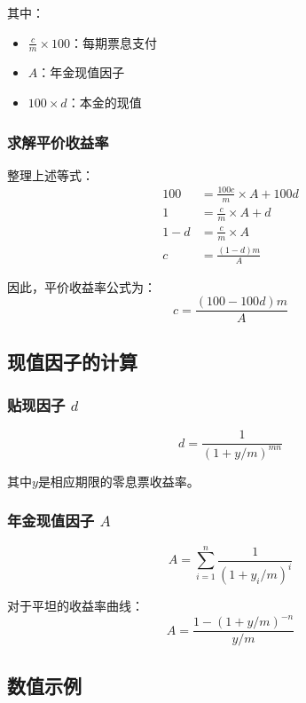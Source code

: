 其中：
\begin{itemize}
    \item $\frac{c}{m} \times 100$：每期票息支付
    \item $A$：年金现值因子
    \item $100 \times d$：本金的现值
\end{itemize}

\subsubsection{求解平价收益率}

整理上述等式：
\begin{align}
100 &= \frac{100c}{m} \times A + 100d \\
1 &= \frac{c}{m} \times A + d \\
1 - d &= \frac{c}{m} \times A \\
c &= \frac{(1-d)m}{A}
\end{align}

因此，平价收益率公式为：
\begin{equation}
\boxed{c = \frac{(100-100d)m}{A}}
\end{equation}

\subsection{现值因子的计算}

\subsubsection{贴现因子 $d$}

\begin{equation}
d = \frac{1}{(1+y/m)^{mn}}
\end{equation}

其中$y$是相应期限的零息票收益率。

\subsubsection{年金现值因子 $A$}

\begin{equation}
A = \sum_{i=1}^{n} \frac{1}{(1+y_i/m)^{i}}
\end{equation}

对于平坦的收益率曲线：
\begin{equation}
A = \frac{1-(1+y/m)^{-n}}{y/m}
\end{equation}

\subsection{数值示例}

